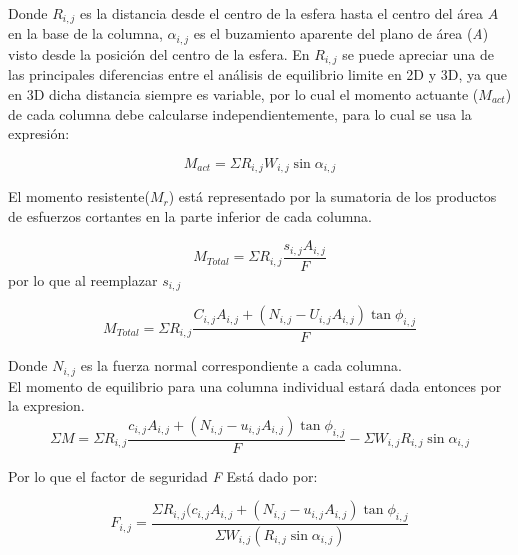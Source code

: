Donde $\textit{R}_{i,j}$ es la distancia desde el centro de la esfera hasta el centro del \'area $\textit{A}$ en la base de la columna, $\alpha_{i,j}$ es el buzamiento aparente del plano de \'area (\textit{A}) visto desde la posici\'on del centro de la esfera. En $\textit{R}_{i,j}$ se puede apreciar una de las principales diferencias entre el an\'alisis de equilibrio limite en 2D y 3D, ya que en 3D dicha distancia siempre es variable, por lo cual el momento actuante ($\textit{M}_{act}$) de cada columna debe calcularse independientemente, para lo cual se usa la expresi\'on:

$$\textit{M}_{act}=\Sigma \textit{R}_{i,j}\textit{W}_{i,j}\sin\alpha_{i,j}  $$

El momento resistente($\textit{M}_{r}$) est\'a representado por la sumatoria de los productos de esfuerzos cortantes en la parte inferior de cada columna.

$$\textit{M}_{Total}= \Sigma \textit{R}_{i,j}\frac{\textit{s}_{i,j}\textit{A}_{i,j}}{\textit{F}}  $$
por lo que al reemplazar $\textit{s}_{i,j}$

$$ {M}_{Total} = \Sigma \textit{R}_{i,j} \frac{\textit{C}_{i,j}\textit{A}_{i,j}+(\textit{N}_{i,j}-\textit{U}_{i,j}\textit{A}_{i,j})\tan\phi_{i,j}}{\textit{F}} $$

Donde $\textit{N}_{i,j}$ es la fuerza normal correspondiente a cada columna.\\

El momento de equilibrio para una columna individual estar\'a dada entonces por la expresion.
$$ \Sigma \textit{M}= \Sigma \textit{R}_{i,j} \frac{\textit{c}_{i,j}\textit{A}_{i,j}+(\textit{N}_{i,j}-\textit{u}_{i,j}\textit{A}_{i,j})\tan\phi _{i,j}}{F}-\Sigma \textit{W}_{i,j}\textit{R}_{i,j}\sin \alpha _{i,j} $$

Por lo que el factor de seguridad \textit{F} Est\'a dado por:

$$\textit{F}_{i,j}=  \frac{\Sigma \textit{R}_{i,j}(\textit{c}_{i,j}\textit{A}_{i,j}+(\textit{N}_{i,j}-\textit{u}_{i,j}\textit{A}_{i,j})\tan \phi _{i,j}}{\Sigma \textit{W} _{i,j}(\textit{R} _{i,j}\sin\alpha _{i,j})}  $$


